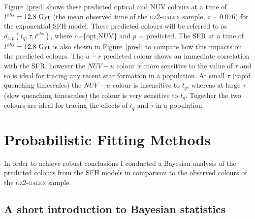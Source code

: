 Figure~\ref{pred} shows these predicted optical and NUV colours at a time of $t^{obs} = 12.8 ~\rm{Gyr}$ (the mean observed time of the \textsc{gz2-galex} sample, $z \sim 0.076$) for the exponential SFH model. These predicted colours will be referred to as $d_{c,p}(t_{q}, \tau, t^{obs})$, where $c$=\{opt,NUV\} and $p$ = predicted. The SFR at a time of $t^{obs}=12.8~\rm{Gyr}$ is also shown in Figure~\ref{pred} to compare how this impacts on the predicted colours. The $u-r$ predicted colour shows an immediate correlation with the SFR, however the $NUV-u$ colour is more sensitive to the value of $\tau$ and so is ideal for tracing any recent star formation in a population. At small $\tau$ (rapid quenching timescales) the $NUV-u$ colour is insensitive to $t_{q}$, whereas at large $\tau$ (slow quenching timescales) the colour is very sensitive to $t_{q}$. Together the two colours are ideal for tracing the effects of $t_{q}$ and $\tau$ in a population. 


\section{Probabilistic Fitting Methods}\label{stats}

In order to achieve robust conclusions I conducted a Bayesian analysis \citep{Sivia, mackay03} of the predicted colours from the SFH models in comparison to the observed colours of the \textsc{gz2-galex} sample. 

\subsection{A short introduction to Bayesian statistics}


